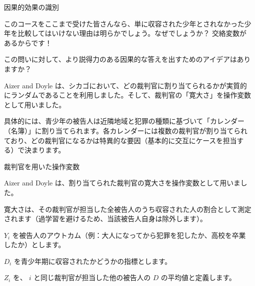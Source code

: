 \documentclass[11pt,handout]{beamer}
\newenvironment{wideitemize}{\itemize\addtolength{\itemsep}{10pt}}{\enditemize}
\begin{document}
\begin{frame}{因果的効果の識別}

\begin{wideitemize}
	\item
	このコースをここまで受けた皆さんなら、単に収容された少年とされなかった少年を比較してはいけない理由は明らかでしょう。なぜでしょうか？ \pause{} 交絡変数があるからです！
	
	\item
	この問いに対して、より説得力のある因果的な答えを出すためのアイデアはありますか？ 
	
	\pause
	\item
	Aizer and Doyle は、シカゴにおいて、どの裁判官に割り当てられるかが実質的にランダムであることを利用しました。そして、裁判官の「寛大さ」を操作変数として用いました。
	
	\pause
	\item
	具体的には、青少年の被告人は近隣地域と犯罪の種類に基づいて「カレンダー（名簿）」に割り当てられます。各カレンダーには複数の裁判官が割り当てられており、どの裁判官になるかは特異的な要因（基本的に交互にケースを担当する）で決まります。
\end{wideitemize}

\end{frame}

\begin{frame}{裁判官を用いた操作変数}
	\begin{wideitemize}
		\item
		Aizer and Doyle は、割り当てられた裁判官の寛大さを操作変数として用いました。
		
		\item
		寛大さは、その裁判官が担当した全被告人のうち収容された人の割合として測定されます（過学習を避けるため、当該被告人自身は除外します）。
		
		\pause
		\item
		$Y_i$ を被告人のアウトカム（例：大人になってから犯罪を犯したか、高校を卒業したか）とします。
		
		\item
		$D_i$ を青少年期に収容されたかどうかの指標とします。
		
		\item
		$Z_i$ を、 $i$ と同じ裁判官が担当した他の被告人の $D$ の平均値と定義します。
	\end{wideitemize}
\end{frame}
\end{document}
